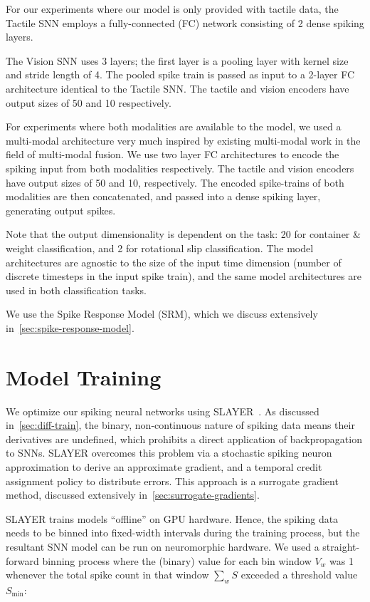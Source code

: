 \documentclass[fyp]{socreport}
\begin{document}
For our experiments where our model is only provided with tactile data, the
Tactile SNN employs a fully-connected (FC) network consisting of 2 dense spiking
layers.

The Vision SNN uses 3 layers; the first layer is a pooling layer with kernel
size and stride length of 4. The pooled spike train is passed as input to a
2-layer FC architecture identical to the Tactile SNN. The tactile and vision
encoders have output sizes of 50 and 10 respectively.

For experiments where both modalities are available to the model, we used a
multi-modal architecture very much inspired by existing multi-modal work in
the field of multi-modal fusion. We use two layer FC architectures to encode the
spiking input from both modalities respectively. The tactile and vision encoders
have output sizes of 50 and 10, respectively. The encoded spike-trains of both
modalities are then concatenated, and passed into a dense spiking layer,
generating output spikes.

Note that the output dimensionality is dependent on the task: 20 for container \&
weight classification, and 2 for rotational slip classification. The model
architectures are agnostic to the size of the input time dimension (number of
discrete timesteps in the input spike train), and the same model architectures
are used in both classification tasks.

We use the Spike Response Model (SRM), which we discuss extensively
in~\autoref{sec:spike-response-model}.

\section{Model Training}

We optimize our spiking neural networks using SLAYER~\cite{NIPS2018_7415}. As
discussed in~\autoref{sec:diff-train}, the binary, non-continuous nature of
spiking data means their derivatives are undefined, which prohibits a direct
application of backpropagation to SNNs. SLAYER overcomes this problem via a
stochastic spiking neuron approximation to derive an approximate gradient, and a
temporal credit assignment policy to distribute errors. This approach is a
surrogate gradient method, discussed extensively
in~\autoref{sec:surrogate-gradients}.

SLAYER trains models ``offline'' on GPU hardware. Hence, the spiking data needs
to be binned into fixed-width intervals during the training process, but the
resultant SNN model can be run on neuromorphic hardware. We used a
straight-forward binning process where the (binary) value for each bin window
$V_{w}$ was 1 whenever the total spike count in that window $\sum_{w} S$
exceeded a threshold value $S_{\text{min}}$:
\end{document}
